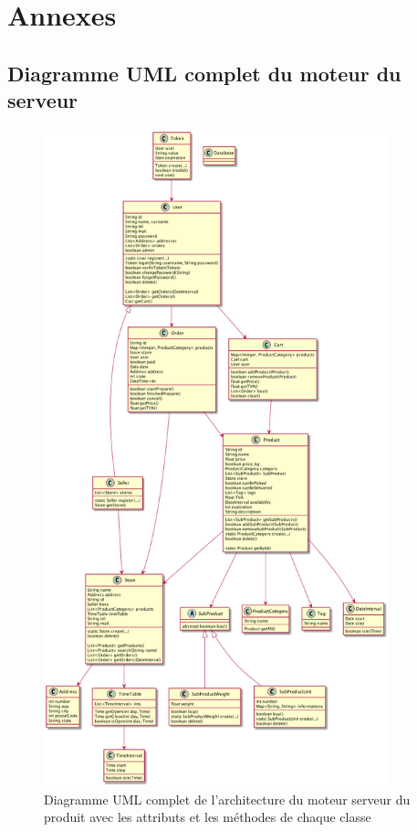 \documentclass[a4paper, 12pt]{article}
\begin{document}
\newpage
\section*{Annexes}
\subsection*{Diagramme UML complet du moteur du serveur}

\begin{figure}[H]
	\begin{center}
		\includegraphics[width=10cm]{fig/uml-all.png}
		\caption*{Diagramme UML complet de l'architecture du moteur serveur du produit avec les attributs et les méthodes de chaque classe}
	\end{center}
\end{figure}
\end{document}
